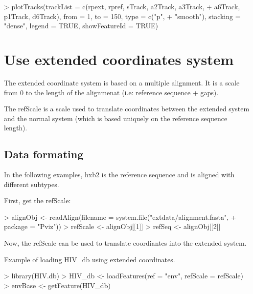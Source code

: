 \documentclass[11pt]{article}
\begin{document}
\begin{Schunk}
\end{Schunk}

\begin{Schunk}
\begin{Sinput}
> plotTracks(trackList = c(rpext, rpref, sTrack, a2Track, a3Track, 
+     a6Track, p1Track, d6Track), from = 1, to = 150, type = c("p", 
+     "smooth"), stacking = "dense", legend = TRUE, showFeatureId = TRUE)
\end{Sinput}
\end{Schunk}

\section{Use extended coordinates system}
The extended coordinate system is based on a multiple alignment. It is a scale from 0 to the length of the alignmenat (i.e: reference sequence + gaps).

The refScale is a scale used to translate coordinates between the extended system and the normal system (which is based uniquely on the reference sequence length).

\subsection{Data formating}
In the following examples, hxb2 is the reference sequence and is aligned with different subtypes.

First, get the refScale:
\begin{Schunk}
\begin{Sinput}
> alignObj <- readAlign(filename = system.file("extdata/alignment.fasta", 
+     package = "Pviz"))
> refScale <- alignObj[[1]]
> refSeq <- alignObj[[2]]
\end{Sinput}
\end{Schunk}

Now, the refScale can be used to translate coordiantes into the extended system.

Example of loading HIV_db using extended coordinates. 
\begin{Schunk}
\begin{Sinput}
> library(HIV.db)
> HIV_db <- loadFeatures(ref = "env", refScale = refScale)
> envBase <- getFeature(HIV_db)
\end{Sinput}
\end{Schunk}
\end{document}
